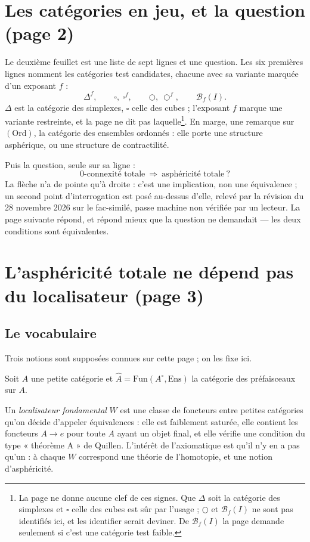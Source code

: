 \documentclass[11pt,a4paper]{article}
\begin{document}
\section*{Les catégories en jeu, et la question (page 2)}

Le deuxième feuillet est une liste de sept lignes et une question. Les six
premières lignes nomment les catégories test candidates, chacune avec sa
variante marquée d'un exposant $f$ :
\[
\Delta^{f}, \qquad \square,\ \square^{f}, \qquad \bigcirc,\ \bigcirc^{f},
\qquad \mathcal{B}_{f}(I).
\]
$\Delta$ est la catégorie des simplexes, $\square$ celle des cubes ;
l'exposant $f$ marque une variante restreinte, et la page ne dit pas
laquelle\footnote{La page ne donne aucune clef de ces signes. Que $\Delta$ soit
la catégorie des simplexes et $\square$ celle des cubes est sûr par l'usage ;
$\bigcirc$ et $\mathcal{B}_{f}(I)$ ne sont pas identifiés ici, et les identifier
serait deviner. De $\mathcal{B}_{f}(I)$ la page demande seulement si c'est une
catégorie test faible.}. En marge, une remarque sur $(\mathrm{Ord})$, la
catégorie des ensembles ordonnés : elle porte une structure asphérique, ou une
structure de contractilité.

Puis la question, seule sur sa ligne :
\[
\text{$0$-connexité totale} \ \Longrightarrow\ \text{asphéricité totale}\ ?
\]
La flèche n'a de pointe qu'à droite : c'est une implication, non une
équivalence ; un second point d'interrogation est posé au-dessus d'elle,
relevé par la révision du 28 novembre 2026 sur le fac-similé, passe machine non vérifiée par un lecteur. La page suivante répond, et répond mieux que la question ne
demandait — les deux conditions sont équivalentes.

\section*{L'asphéricité totale ne dépend pas du localisateur (page 3)}

\subsection*{Le vocabulaire}

Trois notions sont supposées connues sur cette page ; on les fixe ici.

Soit $A$ une petite catégorie et $\hat{A} = \mathrm{Fun}(A^{\circ},
\mathrm{Ens})$ la catégorie des préfaisceaux sur $A$.

Un \emph{localisateur fondamental} $W$ est une classe de foncteurs entre petites
catégories qu'on décide d'appeler équivalences : elle est faiblement saturée,
elle contient les foncteurs $A \to e$ pour toute $A$ ayant un objet final, et
elle vérifie une condition du type « théorème A » de Quillen. L'intérêt de
l'axiomatique est qu'il n'y en a pas qu'un : à chaque $W$ correspond une théorie
de l'homotopie, et une notion d'asphéricité.
\end{document}
